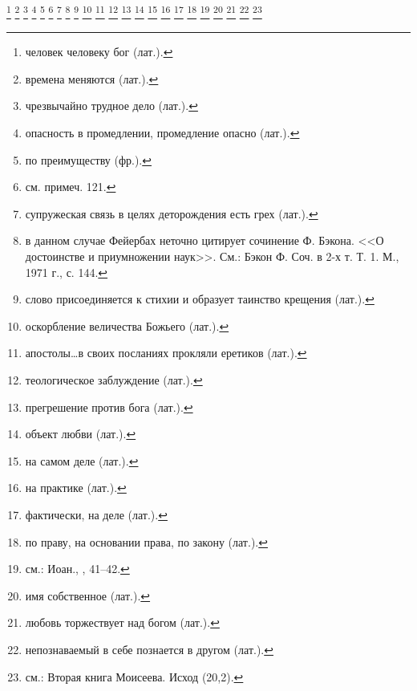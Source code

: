 \documentclass[12pt,oneside]{book}
\newcommand{\rom}[1]{\uppercase\expandafter{\romannumeral #1\relax}}
\begin{document}
\footnote{человек человеку бог (лат.).}
\footnote{времена меняются (лат.).}
\footnote{чрезвычайно трудное дело (лат.).}
\footnote{опасность в промедлении, промедление опасно (лат.).}
\footnote{по преимуществу (фр.).}
\footnote{см. примеч. 121.}
\footnote{супружеская связь в целях деторождения есть грех (лат.).}
\footnote{в данном случае Фейербах неточно цитирует сочинение Ф. Бэкона. <<О достоинстве и приумножении наук>>. См.: Бэкон Ф. Соч. в 2-х т. Т. 1. М., 1971 г., с. 144.}
\footnote{слово присоединяется к стихии и образует таинство крещения (лат.).}
\footnote{оскорбление величества Божьего (лат.).}
\footnote{апостолы\dots в своих посланиях прокляли еретиков (лат.).}
\footnote{теологическое заблуждение (лат.).}
\footnote{прегрешение против бога (лат.).}
\footnote{объект любви (лат.).}
\footnote{на самом деле (лат.).}
\footnote{на практике (лат.).}
\footnote{фактически, на деле (лат.).}
\footnote{по праву, на основании права, по закону (лат.).}
\footnote{см.: Иоан., \rom{2}, 41--42.}
\footnote{имя собственное (лат.).}
\footnote{любовь торжествует над богом (лат.).}
\footnote{непознаваемый в себе познается в другом (лат.).}
\footnote{см.: Вторая книга Моисеева. Исход (20,2).}
\end{document}
